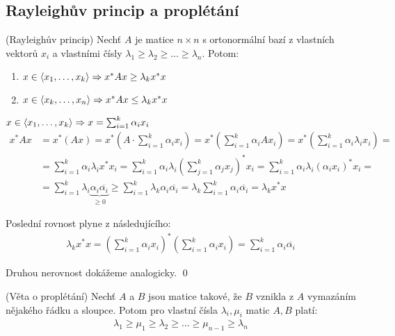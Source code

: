 \subsection{Rayleighův princip a proplétání}


\vt (Rayleighův princip) Nechť $A$ je matice $n\times n$ s ortonormální bazí z vlastních 
vektorů $x_i$ a vlastními čísly $\lambda_1 \geq \lambda_2 \geq\dots\geq\lambda_n$. Potom:
\begin{enumerate}
\item $x \in{\langle x_1,\dots,x_k\rangle} \Rightarrow x^*Ax\ge \lambda_kx^*x$
\item $x \in{\langle x_k,\dots,x_n\rangle} \Rightarrow x^*Ax\le \lambda_kx^*x$
\end{enumerate}

\dk $x \in{\langle x_1,\dots,x_k\rangle} \Rightarrow x = \sum_{i=1}^k \alpha_ix_i$
\begin{align*}
	x^*Ax &= x^*(Ax) = x^*\left(A\cdot\sum_{i=1}^k\alpha_ix_i\right) = x^*\left(\sum_{i=1}^k\alpha_iAx_i\right) = x^*\left(\sum_{i=1}^k\alpha_i\lambda_ix_i\right) = \\
	&= \sum_{i=1}^k\alpha_i\lambda_ix^*x_i = \sum_{i=1}^k\alpha_i\lambda_i\left(\sum_{j=1}^k \alpha_jx_j\right)^*x_i = \sum_{i=1}^k \alpha_i\lambda_i(\alpha_ix_i)^*x_i = \\
	&= \sum_{i=1}^k \lambda_i\underbrace{\alpha_i\overline{\alpha_i}}_{\ge 0} \ge \sum_{i=1}^k \lambda_k\alpha_i\overline{\alpha_i} = \lambda_k\sum_{i=1}^k \alpha_i\overline{\alpha_i} = \lambda_kx^*x
\end{align*}

Poslední rovnost plyne z následujícího:
\begin{align*}
	 \lambda_kx^*x = \left(\sum_{i=1}^k \alpha_ix_i\right)^*\left(\sum_{i=1}^k \alpha_ix_i\right) = \sum_{i=1}^k \alpha_i\overline{\alpha_i}
\end{align*}

Druhou nerovnost dokážeme analogicky. \qed


\vt (Věta o proplétání) Nechť $A$ a $B$ jsou matice takové, že $B$ vznikla z $A$ 
vymazáním nějakého řádku a sloupce. Potom pro vlastní čísla $\lambda_i,\mu_i$ 
matic $A,B$ platí:
\begin{align}
	\lambda_1 \geq \mu_1 \geq \lambda_2 \geq \dots\geq \mu_{n-1} \geq \lambda_n
\end{align}

